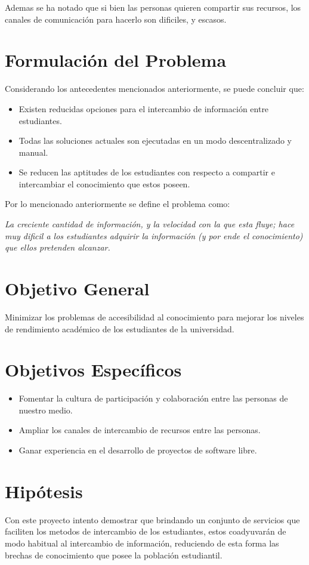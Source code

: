 \documentclass[letter,11pt,oneside,spanish]{article}
\begin{document}
Ademas se ha notado que si bien las personas quieren compartir sus recursos, los canales de
comunicación para hacerlo son dificiles, y escasos.

\section{Formulación del Problema}
Considerando los antecedentes mencionados anteriormente, se puede concluir que:

\begin{itemize}
\item Existen reducidas opciones para el intercambio de información entre estudiantes.
\item Todas las soluciones actuales son ejecutadas en un modo descentralizado y manual.
\item Se reducen las aptitudes de los estudiantes con respecto a compartir e intercambiar el
conocimiento que estos poseen.
\end{itemize}

Por lo mencionado anteriormente se define el problema como:

\emph{La creciente cantidad de información, y la velocidad con la que esta fluye; hace muy dificil
a los estudiantes adquirir la información (y por ende el conocimiento) que ellos pretenden
alcanzar.}

\section{Objetivo General}
Minimizar los problemas de accesibilidad al conocimiento para mejorar los niveles de rendimiento
académico de los estudiantes de la universidad.

\section{Objetivos Específicos}
\begin{itemize}
\item Fomentar la cultura de participación y colaboración entre las personas de nuestro medio.
\item Ampliar los canales de intercambio de recursos entre las personas.
\item Ganar experiencia en el desarrollo de proyectos de software libre.
\end{itemize}

\section{Hipótesis}
Con este proyecto intento demostrar que brindando un conjunto de servicios que faciliten los metodos
de intercambio de los estudiantes, estos coadyuvarán de modo habitual al intercambio de información,
reduciendo de esta forma las brechas de conocimiento que posee la población estudiantil.
\end{document}
